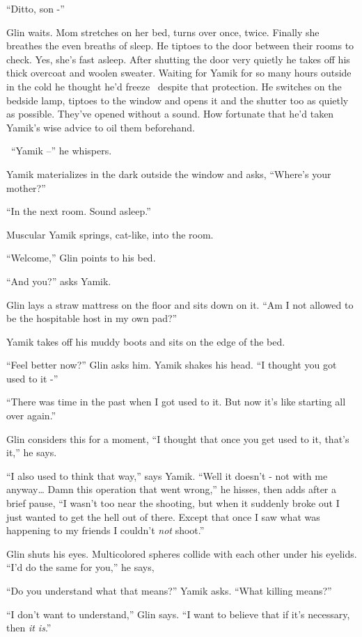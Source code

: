 \documentclass[twoside,11pt]{book}
\begin{document}
``Ditto, son -''

Glin waits. Mom stretches on her bed, turns over once, twice. Finally she breathes the even breaths of sleep. He tiptoes
to the door between their rooms to check. Yes, she's fast asleep. After shutting the door very quietly he takes off his
thick overcoat and woolen sweater. Waiting for Yamik for so many hours outside in the cold he thought he'd freeze
\ despite that protection. He switches on the bedside lamp, tiptoes to the window and opens it and the shutter too as
quietly as possible. They've opened without a sound. How fortunate that
he'd taken Yamik's wise advice to
oil them beforehand.

\ ``Yamik --'' he whispers.

Yamik materializes in the dark outside the window and asks, ``Where's your mother?''

``In the next room. Sound asleep.''

Muscular Yamik springs, cat-like, into the room.

``Welcome,'' Glin points to his bed.

``And you?'' asks Yamik.

Glin lays a straw mattress on the floor and sits down on it. ``Am I not allowed to be the hospitable host
in my own pad?''

Yamik takes off his muddy boots and sits on the edge of the bed.

``Feel better now?'' Glin asks him. Yamik shakes his
head. ``I thought you got used to it -''

``There was time in the past when I got used to it. But now it's like starting all over
again.''

Glin considers this for a moment, ``I thought that once you get used to it, that's it,'' he
says.

``I also used to think that way,'' says Yamik. ``Well it doesn't - not with me anyway{\dots} Damn this
operation that went wrong,'' he hisses, then adds after a brief pause, ``I wasn't too near
the shooting, but when it suddenly broke out I
just wanted to get the hell out of there. Except that once I saw what was
happening to my friends I couldn't \textit{not} shoot.''

Glin shuts his eyes. Multicolored spheres collide with each other under his eyelids. ``I'd do the same for
you,'' he says,

``Do you understand what that means?'' Yamik asks. ``What killing
means?''

``I don't want to understand,'' Glin says. ``I want to believe that if it's
necessary, then \textit{it is}.''
\end{document}

